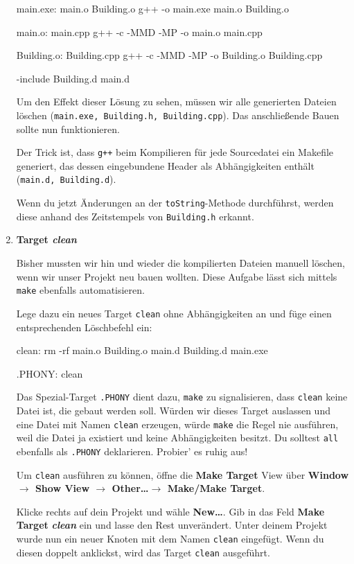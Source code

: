 \begin{enumerate}
\begin{lstmake}
main.exe: main.o Building.o
	g++ -o main.exe main.o Building.o

main.o: main.cpp
	g++ -c -MMD -MP -o main.o main.cpp

Building.o: Building.cpp
	g++ -c -MMD -MP -o Building.o Building.cpp

-include Building.d main.d
\end{lstmake}

Um den Effekt dieser Lösung zu sehen, müssen wir alle generierten Dateien löschen (\texttt{main.exe, Building.h, Building.cpp}).
Das anschließende Bauen sollte nun funktionieren.

Der Trick ist, dass \texttt{g++} beim Kompilieren für jede Sourcedatei ein Makefile generiert, das dessen eingebundene Header als Abhängigkeiten enthält (\texttt{main.d, Building.d}).

Wenn du jetzt Änderungen an der \texttt{toString}-Methode durchführst, werden diese anhand des Zeitstempels von \texttt{Building.h} erkannt.




\item\textbf{Target \emph{clean}}

Bisher mussten wir hin und wieder die kompilierten Dateien manuell löschen, wenn wir unser Projekt neu bauen wollten.
Diese Aufgabe lässt sich mittels \texttt{make} ebenfalls automatisieren.

Lege dazu ein neues Target \texttt{clean} ohne Abhängigkeiten an und füge einen entsprechenden Löschbefehl ein:
\begin{lstmake}
clean:
	rm -rf main.o Building.o main.d Building.d main.exe

.PHONY: clean
\end{lstmake}
Das Spezial-Target \texttt{.PHONY} dient dazu, \texttt{make} zu signalisieren, dass \texttt{clean} keine Datei ist, die gebaut werden soll.
Würden wir dieses Target auslassen und eine Datei mit Namen \texttt{clean} erzeugen, würde \texttt{make} die Regel nie ausführen, weil die Datei ja existiert und keine Abhängigkeiten besitzt.
Du solltest \texttt{all} ebenfalls als \texttt{.PHONY} deklarieren.
Probier' es ruhig aus!

Um \texttt{clean} ausführen zu können, öffne die \textbf{Make Target} View über \textbf{Window $\to$ Show View $\to$ Other\dots $\to$ Make/Make Target}.

Klicke rechts auf dein Projekt und wähle \textbf{New\dots}.
Gib in das Feld \textbf{Make Target} \textbf{\emph{clean}} ein und lasse den Rest unverändert.
Unter deinem Projekt wurde nun ein neuer Knoten mit dem Namen \texttt{clean} eingefügt.
Wenn du diesen doppelt anklickst, wird das Target \texttt{clean} ausgeführt.


\end{enumerate}
